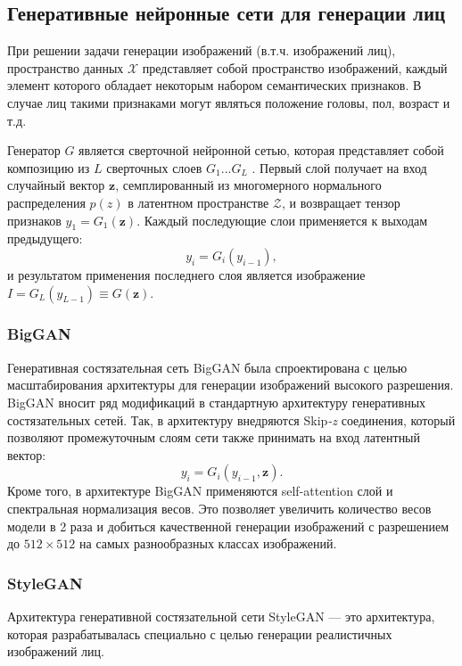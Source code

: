 \subsection{Генеративные нейронные сети для генерации лиц}

При решении задачи генерации изображений (в.т.ч. изображений лиц), пространство данных $\mathcal X$ представляет собой пространство изображений, каждый элемент которого обладает некоторым набором семантических признаков.
В случае лиц такими признаками могут являться положение головы, пол, возраст и т.д.

Генератор $G$ является сверточной нейронной сетью, которая представляет собой композицию из $L$ сверточных слоев $G_1 ... G_L$ . 
Первый слой получает на вход случайный вектор $\mathbf z$, семплированный из многомерного нормального распределения $p(z)$ в латентном пространстве $\mathcal Z$, и возвращает тензор признаков $y_1 = G_1(\mathbf z)$. 
Каждый последующие слои применяется к выходам предыдущего: 
$$ y_i = G_i(y_{i-1}), $$
и результатом применения последнего слоя является изображение $I = G_L(y_{L-1}) \equiv G(\mathbf z)$.

\subsubsection{BigGAN}

Генеративная состязательная сеть BigGAN \cite{bigGAN} была спроектирована с целью масштабирования архитектуры для генерации изображений высокого разрешения.
BigGAN вносит ряд модификаций в стандартную архитектуру генеративных состязательных сетей.
Так, в архитектуру внедряются Skip\emph{-z} соединения, который позволяют промежуточным слоям сети также принимать на вход латентный вектор:
$$ y_i = G_i(y_{i-1}, \mathbf z). $$
Кроме того, в архитектуре BigGAN применяются self-attention слой и спектральная нормализация весов.
Это позволяет увеличить количество весов модели в 2 раза и добиться качественной генерации изображений с разрешением до $512\times512$ на самых разнообразных классах изображений.

\subsubsection{StyleGAN}
Архитектура генеративной состязательной сети StyleGAN \cite{StyleGAN} --– это архитектура, которая разрабатывалась специально с целью генерации реалистичных изображений лиц.


